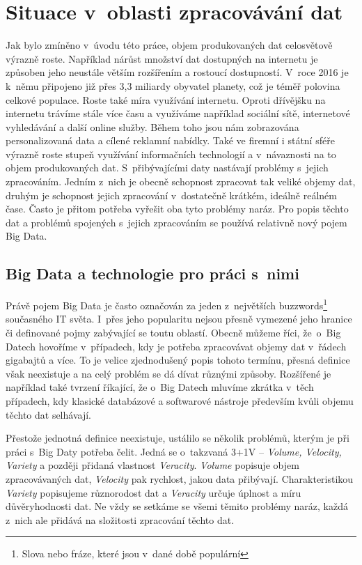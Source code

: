 \documentclass[thesis=B,czech]{FITthesis}[2012/06/26]
\begin{document}
\chapter{Situace v~oblasti zpracovávání dat}
\label{data-processing}
	Jak bylo zmíněno v~úvodu této práce, objem produkovaných dat celosvětově výrazně roste. Například nárůst množství dat dostupných na internetu je způsoben jeho neustále větším rozšířením a rostoucí dostupností. V~roce 2016 je k~němu připojeno již přes 3,3 miliardy obyvatel planety\cite{internet-live-stats}, což je téměř polovina celkové populace. Roste také míra využívání internetu. Oproti dřívějšku na internetu trávíme stále více času a využíváme například sociální sítě, internetové vyhledávání a další online služby. Během toho jsou nám zobrazována personalizovaná data a cílené reklamní nabídky. Také ve firemní i státní sféře výrazně roste stupeň využívání informačních technologií a v~návaznosti na to objem produkovaných dat. S~přibývajícími daty nastávají problémy s~jejich zpracováním. Jedním z~nich je obecně schopnost zpracovat tak veliké objemy dat, druhým je schopnost jejich zpracování v~dostatečně krátkém, ideálně reálném čase. Často je přitom potřeba vyřešit oba tyto problémy naráz. Pro popis těchto dat a problémů spojených s~jejich zpracováním se používá relativně nový pojem Big Data. 

		 
\section{Big Data a technologie pro práci s~nimi}
	Právě pojem Big Data je často označován za jeden z~největších buzzwords\footnote{Slova nebo fráze, které jsou v~dané době populární} současného IT světa. I~přes jeho popularitu nejsou přesně vymezené jeho hranice či definované pojmy zabývající se toutu oblastí. Obecně můžeme říci, že~o~Big Datech hovoříme v~případech, kdy je potřeba zpracovávat objemy dat v~řádech gigabajtů a více. To je velice zjednodušený popis tohoto termínu, přesná definice však neexistuje a na celý problém se dá dívat různými způsoby. Rozšířené je například také tvrzení říkající, že o~Big Datech mluvíme zkrátka v~těch případech, kdy klasické databázové a softwarové nástroje především kvůli objemu těchto dat selhávají\cite{webopedia-bigdata}. 

	Přestože jednotná definice neexistuje, ustálilo se několik problémů, kterým je při práci s~Big Daty potřeba čelit. Jedná se o~takzvaná 3+1V -- \textit{Volume, Velocity, Variety} a později přidaná vlastnost \textit{Veracity}\cite{dp-customer-inteligence}. \textit{Volume} popisuje objem zpracovávaných dat, \textit{Velocity} pak rychlost, jakou data přibývají. Charakteristikou \textit{Variety} popisujeme různorodost dat a \textit{Veracity} určuje úplnost a míru důvěryhodnosti dat. Ne vždy se setkáme se všemi těmito problémy naráz, každá z~nich ale přidává na složitosti zpracování těchto dat. 
	
\end{document}
